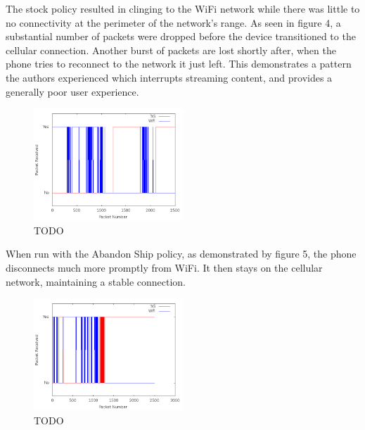 The stock policy resulted in clinging to the WiFi network while there was little to no connectivity at the perimeter of the network's range. As seen in figure 4, a substantial number of packets were dropped before the device transitioned to the cellular connection. Another burst of packets are lost shortly after, when the phone tries to reconnect to the network it just left. This demonstrates a pattern the authors experienced which interrupts streaming content, and provides a generally poor user experience.

\begin{figure}
	\includegraphics[width=0.5\textwidth]{leavingCourtyardsNoPolicy}
	\caption{TODO}
\end{figure}

When run with the Abandon Ship policy, as demonstrated by figure 5, the phone disconnects much more promptly from WiFi. It then stays on the cellular network, maintaining a stable connection.

\begin{figure}
	\includegraphics[width=0.5\textwidth]{leavingCourtyardsWithPolicy}
	\caption{TODO}
\end{figure}

